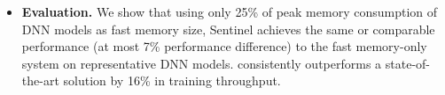 \begin{itemize}[leftmargin=*]

\item \textbf{Evaluation.} %
We show that using only \textcolor{check}{25\%} of peak memory consumption of DNN models as fast memory size, Sentinel achieves the same or comparable performance (at most \textcolor{check}{7\%} performance difference) to  the fast memory-only system on representative DNN models. \name consistently outperforms a state-of-the-art solution by \textcolor{check}{16\%} in training throughput.

 
\end{itemize}





\begin{comment}
CPU for machine learning. 

We focus on CPU as the training platform because of following reasons:
(1) The widespread deployment of CPUs makes this hardware platform an attractive target for machine learning model training. 
(2) The optimizations on GPU lack of generality. 
(3) In terms of programmability, porting the original
code to GPU kernels requires significant programming efforts; 
(4) GPU has strong bias towards certain application.
Existing effort has been made in academic and industry to optimize machine learning training on widely available CPU based architecture. Adam~\cite{Chilimbi:2014:PAB:2685048.2685094} from Microsoft. Intel MKL-DNN\cite{intelMKL} has been proposed to accelerate machine learning training. 

\end{comment}